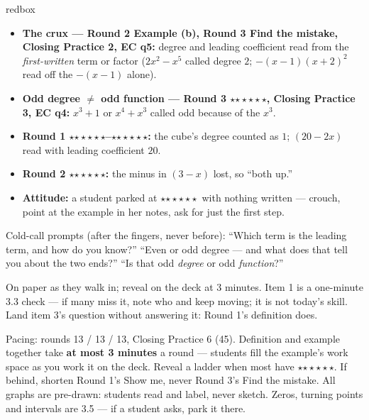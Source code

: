 \documentclass[10pt]{article}
\newcommand{\rung}[1]{{\color{goldacc}\ifcase#1\or$\star$\or$\star\star$\or$\star\star\star$\fi}}
\begin{document}
\boxguard
\begin{skillbox}{redbox}
\begin{itemize}[leftmargin=1.2em, nosep]
  \item \textbf{The crux --- Round 2 Example (b), Round 3 Find the mistake, Closing Practice 2,
        EC q5:} degree and leading coefficient read from the \emph{first-written} term or factor
        ($2x^2-x^5$ called degree $2$; $-(x-1)(x+2)^2$ read off the $-(x-1)$ alone).
  \item \textbf{Odd degree $\ne$ odd function --- Round 3 \rung3, Closing Practice 3, EC q4:}
        $x^3+1$ or $x^4+x^3$ called odd because of the $x^3$.
  \item \textbf{Round 1 \rung2--\rung3:} the cube's degree counted as $1$; $(20-2x)$ read with
        leading coefficient $20$.
  \item \textbf{Round 2 \rung3:} the minus in $(3-x)$ lost, so ``both up.''
  \item \textbf{Attitude:} a student parked at \rung1\ with nothing written --- crouch, point at
        the example in her notes, ask for just the first step.
\end{itemize}
Cold-call prompts (after the fingers, never before): ``Which term is the leading term, and how
do you know?'' \; ``Even or odd degree --- and what does that tell you about the two ends?'' \;
``Is that odd \emph{degree} or odd \emph{function}?''
\end{skillbox}

\begin{teachernote}[Warm-Up]
On paper as they walk in; reveal on the deck at 3 minutes. Item 1 is a one-minute 3.3 check ---
if many miss it, note who and keep moving; it is not today's skill. Land item 3's question
without answering it: Round 1's definition does.
\end{teachernote}

\begin{teachernote}
Pacing: rounds 13 / 13 / 13, Closing Practice 6 (45). Definition and example together take
\textbf{at most 3 minutes} a round --- students fill the example's work space as you work it on
the deck. Reveal a ladder when most have \rung2. If behind, shorten Round 1's Show me, never
Round 3's Find the mistake. All graphs are pre-drawn: students read and label, never sketch.
Zeros, turning points and intervals are 3.5 --- if a student asks, park it there.
\end{teachernote}
\end{document}
